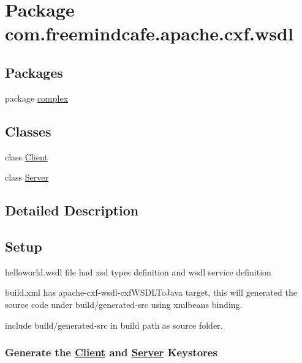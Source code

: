 \hypertarget{namespacecom_1_1freemindcafe_1_1apache_1_1cxf_1_1wsdl}{}\section{Package com.\+freemindcafe.\+apache.\+cxf.\+wsdl}
\label{namespacecom_1_1freemindcafe_1_1apache_1_1cxf_1_1wsdl}
\subsection*{Packages}
\begin{DoxyCompactItemize}
\item 
package \hyperlink{namespacecom_1_1freemindcafe_1_1apache_1_1cxf_1_1wsdl_1_1complex}{complex}
\end{DoxyCompactItemize}
\subsection*{Classes}
\begin{DoxyCompactItemize}
\item 
class \hyperlink{classcom_1_1freemindcafe_1_1apache_1_1cxf_1_1wsdl_1_1_client}{Client}
\item 
class \hyperlink{classcom_1_1freemindcafe_1_1apache_1_1cxf_1_1wsdl_1_1_server}{Server}
\end{DoxyCompactItemize}


\subsection{Detailed Description}
\subsection*{Setup}


\begin{DoxyItemize}
\item helloworld.\+wsdl file had xsd types definition and wsdl service definition 
\item build.\+xml has apache-\/cxf-\/wsdl-\/cxf\+W\+S\+D\+L\+To\+Java target, this will generated the source code under build/generated-\/src using xmlbeans binding. 
\item include build/generated-\/src in build path as source folder. 
\end{DoxyItemize}\subsubsection*{Generate the \hyperlink{classcom_1_1freemindcafe_1_1apache_1_1cxf_1_1wsdl_1_1_client}{Client} and \hyperlink{classcom_1_1freemindcafe_1_1apache_1_1cxf_1_1wsdl_1_1_server}{Server} Keystores}


